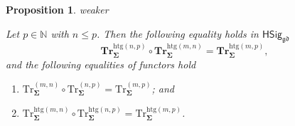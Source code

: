 \documentclass[a4paper, reqno]{amsbook}
\makeatletter
\newcommand{\sig}[1]{\mathbf{#1}}             %
\newcommand{\gd}{\mathfrak{gd}}              %
\newcommand{\htg}{\mathrm{htg}}                %
\newcommand{\Tr}{\mathrm{Tr}}
\newcommand{\bTr}{\mathbf{Tr}}
\theoremstyle{plain}
\newtheorem{proposition}[theorem]{Proposition}
\theoremstyle{definition}
\newcommand*{\CA@leanpending}{}
\newcommand*{\CA@leanrelation}{}
\newcommand*{\lean}[2]{%
  \ifcsname\string\color@lean@#1\endcsname\else
    \PackageError{main}{Unknown relation `#1' in \string\lean}{Use equivalent, weaker or stronger.}%
  \fi
  \gdef\CA@leanrelation{#1}%
  \gdef\CA@leanpending{#2}}
\makeatother
\begin{document}
\begin{proposition}\label{PTrComp}\lean{weaker}{Dimensions.heterogeneousTruncation_comp,Dimensions.homogeneousTruncationFunctorComp,Dimensions.heterogeneousTruncationFunctorComp}
Let $p\in\mathbb{N}$ with $n\leq p$.
Then the following equality holds in $\mathsf{HSig}_{\gd}$
$$
\bTr^{\htg(n,p)}_{\sig{\Sigma}}\circ\bTr^{\htg(m,n)}_{\sig{\Sigma}}=\bTr^{\htg(m,p)}_{\sig{\Sigma}},
$$
and the following equalities of functors hold
\begin{enumerate}
	\item
	$\Tr^{(m,n)}_{\sig{\Sigma}}\circ \Tr^{(n,p)}_{\sig{\Sigma}}=\Tr^{(m,p)}_{\sig{\Sigma}}$; and

	\item
	$\Tr^{\htg(m,n)}_{\sig{\Sigma}}\circ \Tr^{\htg(n,p)}_{\sig{\Sigma}}=\Tr^{\htg(m,p)}_{\sig{\Sigma}}$.
\end{enumerate}
\end{proposition}
\end{document}
